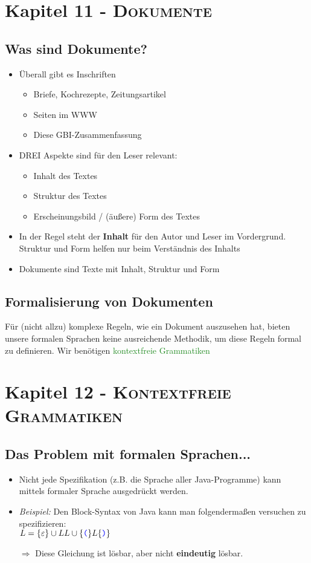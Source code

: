 \documentclass{article}
\newcommand{\kapitel}[2]{Kapitel #1 - \textsc{#2}}
\newcommand{\blue}[1]{\textcolor{blue}{#1}}
\newcommand{\strongColor}[1]{\textcolor{strongColor}{#1}}
\newcommand{\strong}[1]{\textbf{\strongColor{#1}}}
\newcommand{\important}[1]{\textcolor{importantColor}{#1}}
\newcommand{\verweis}[1]{\textcolor{ForestGreen}{#1}}
\newcommand{\example}[1]{\textit{Beispiel: }#1}
\newcommand{\word}[1]{\blue{\texttt{#1}}}
\newcommand{\set}[1]{\{#1\}}
\begin{document}
\newpage
\section{\kapitel{11}{Dokumente}}
\subsection{Was sind Dokumente?}
\begin{itemize}
    \item Überall gibt es Inschriften
    \begin{itemize}
        \item Briefe, Kochrezepte, Zeitungsartikel
        \item Seiten im WWW
        \item Diese GBI-Zusammenfassung
    \end{itemize}
    \item DREI Aspekte sind für den Leser relevant:
    \begin{itemize}
        \item \important{Inhalt} des Textes
        \item \important{Struktur} des Textes
        \item \important{Erscheinungsbild} / (äußere) \important{Form} des Textes
    \end{itemize}
    \item In der Regel steht der \strong{Inhalt} für den Autor und Leser im Vordergrund.\\
    Struktur und Form helfen nur beim Verständnis des Inhalts
    \item \important{Dokumente} sind Texte mit Inhalt, Struktur und Form
\end{itemize}
\subsection{Formalisierung von Dokumenten}
Für (nicht allzu) komplexe Regeln, wie ein Dokument auszusehen hat, bieten unsere formalen Sprachen keine ausreichende Methodik, um diese Regeln formal zu definieren. Wir benötigen \verweis{kontextfreie Grammatiken} 

\newpage
\section{\kapitel{12}{Kontextfreie Grammatiken}}
\subsection{Das Problem mit formalen Sprachen...}
\begin{itemize}
    \item Nicht jede Spezifikation (z.B. die Sprache aller Java-Programme) kann mittels formaler Sprache ausgedrückt werden.
    \item \example{Den Block-Syntax von Java kann man folgendermaßen versuchen zu spezifizieren:\\$L=\set{\varepsilon}\cup LL\cup\set{\word{(}}L\set{\word{)}}$}
    \item[$\Rightarrow$]Diese Gleichung ist \important{lösbar}, aber nicht \important{\strong{eindeutig} lösbar}.
\end{itemize}
\end{document}
